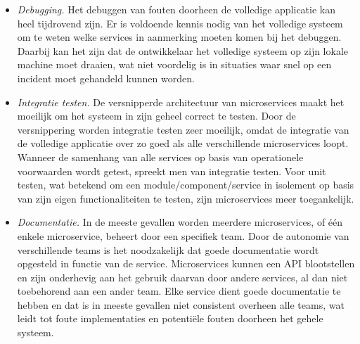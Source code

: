 \begin{itemize}[label=$\bullet$]
    \item \emph{Debugging.}
    Het debuggen van fouten doorheen de volledige applicatie kan heel tijdrovend zijn. Er is voldoende kennis nodig van het volledige systeem om te weten welke services in aanmerking moeten komen bij het debuggen. Daarbij kan het zijn dat de ontwikkelaar het volledige systeem op zijn lokale machine moet draaien, wat niet voordelig is in situaties waar snel op een incident moet gehandeld kunnen worden.
    \newline
    
    \item \emph{Integratie testen.}
    De versnipperde architectuur van microservices maakt het moeilijk om het systeem in zijn geheel correct te testen. Door de versnippering worden integratie testen zeer moeilijk, omdat de integratie van de volledige applicatie over zo goed als alle verschillende microservices loopt. Wanneer de samenhang van alle services op basis van operationele voorwaarden wordt getest, spreekt men van integratie testen. Voor unit testen, wat betekend om een module/component/service in isolement op basis van zijn eigen functionaliteiten te testen, zijn microservices meer toegankelijk.
    \newline
    
    \item \emph{Documentatie.}
    In de meeste gevallen worden meerdere microservices, of één enkele microservice, beheert door een specifiek team. Door de autonomie van verschillende teams is het noodzakelijk dat goede documentatie wordt opgesteld in functie van de service. Microservices kunnen een API blootstellen en zijn onderhevig aan het gebruik daarvan door andere services, al dan niet toebehorend aan een ander team. Elke service dient goede documentatie te hebben en dat is in meeste gevallen niet consistent overheen alle teams, wat leidt tot foute implementaties en potentiële fouten doorheen het gehele systeem.
\end{itemize}

